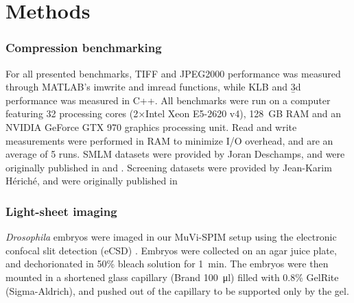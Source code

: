   





\section{Methods}
  \label{sec:methodsB3D}
\subsubsection{Compression benchmarking}
For all presented benchmarks, TIFF and JPEG2000 performance was measured through MATLAB's imwrite and imread functions, while KLB and \b3d performance was measured in C++. All benchmarks were run on a computer featuring 32 processing cores (2×Intel Xeon E5-2620 v4), \SI{128}{GB} RAM and an NVIDIA GeForce GTX 970 graphics processing unit. Read and write measurements were performed in RAM to minimize I/O overhead, and are an average of 5 runs. SMLM datasets were provided by Joran Deschamps, and were originally published in \cite{deschamps_3d_2014} and \cite{deschamps_efficient_2016}. Screening datasets were provided by Jean-Karim Hériché, and were originally published in \cite{simpson_genome-wide_2012}

\subsubsection{Light-sheet imaging}
\textit{Drosophila} embryos were imaged in our MuVi-SPIM setup \cite{krzic_multiview_2012} using the electronic confocal slit detection (eCSD) \cite{de_medeiros_confocal_2015}. Embryos were collected on an agar juice plate, and dechorionated in 50\% bleach solution for \SI{1}{min}. The embryos were then mounted in a shortened glass capillary (Brand \SI{100}{\micro l}) filled with 0.8\% GelRite (Sigma-Aldrich), and pushed out of the capillary to be supported only by the gel.


